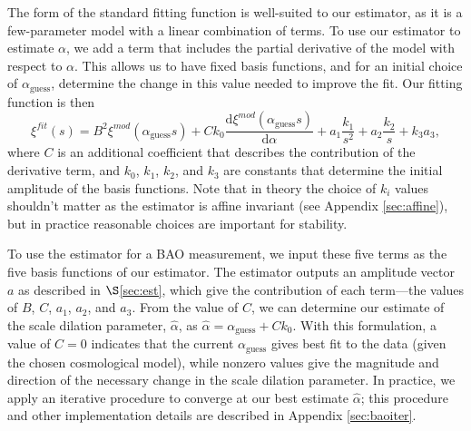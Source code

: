 \documentclass[modern]{aastex62}
\newcommand{\dd}{\mathrm{d}}
\begin{document}
The form of the standard fitting function is well-suited to our estimator, as it is a few-parameter model with a linear combination of terms.
To use our estimator to estimate $\alpha$, we add a term that includes the partial derivative of the model with respect to $\alpha$.
This allows us to have fixed basis functions, and for an initial choice of $\alpha_\mathrm{guess}$, determine the change in this value needed to improve the fit. 
Our fitting function is then
\begin{equation} \label{eq:baoiter_fit}
\xi^{fit}(s) = B^2 \xi^{mod}(\alpha_\mathrm{guess} s) + C k_0 \frac{\dd \xi^{mod}(\alpha_\mathrm{guess} s)}{\dd \alpha} + a_1\frac{k_1}{s^2} + a_2\frac{k_2}{s} + k_3 a_3,
\end{equation}
where $C$ is an additional coefficient that describes the contribution of the derivative term, and $k_0$, $k_1$, $k_2$, and $k_3$ are constants that determine the initial amplitude of the basis functions.
Note that in theory the choice of $k_i$ values shouldn't matter as the estimator is affine invariant (see Appendix \ref{sec:affine}), but in practice reasonable choices are important for stability.

To use the estimator for a BAO measurement, we input these five terms as the five basis functions of our estimator.
The estimator outputs an amplitude vector $a$ as described in $\S$\ref{sec:est}, which give the contribution of each term---the values of $B$, $C$, $a_1$, $a_2$, and $a_3$.
From the value of $C$, we can determine our estimate of the scale dilation parameter, $\hat{\alpha}$, as $\hat{\alpha} = \alpha_\mathrm{guess} + Ck_0$. 
With this formulation, a value of $C=0$ indicates that the current $\alpha_\mathrm{guess}$ gives best fit to the data (given the chosen cosmological model), while nonzero values give the magnitude and direction of the necessary change in the scale dilation parameter.
In practice, we apply an iterative procedure to converge at our best estimate $\hat{\alpha}$; this procedure and other implementation details are described in Appendix \ref{sec:baoiter}.
\end{document}
